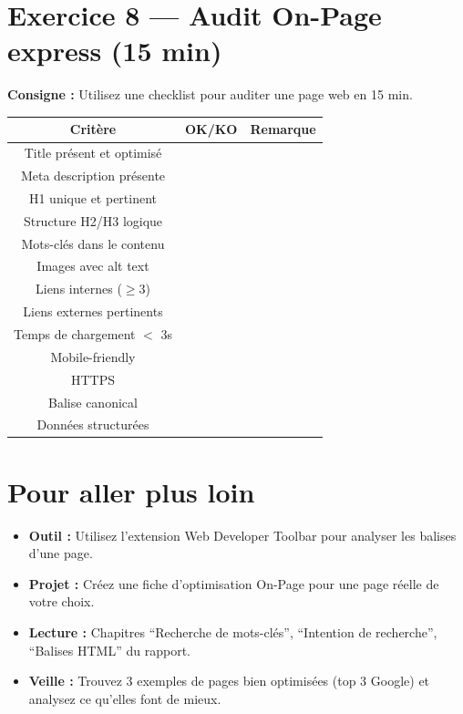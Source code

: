 \documentclass[12pt,a4paper]{report}
\begin{document}
\section{Exercice 8 --- Audit On-Page express (15 min)}

\textbf{Consigne :} Utilisez une checklist pour auditer une page web en 15 min.

\begin{longtable}{clp{6cm}}
\toprule
Crit\`{e}re & OK/KO & Remarque \\
\midrule
\endhead
\bottomrule
\endfoot
Title pr\'{e}sent et optimis\'{e} & & \\
Meta description pr\'{e}sente & & \\
H1 unique et pertinent & & \\
Structure H2/H3 logique & & \\
Mots-cl\'{e}s dans le contenu & & \\
Images avec alt text & & \\
Liens internes ($\geq$3) & & \\
Liens externes pertinents & & \\
Temps de chargement $<$ 3s & & \\
Mobile-friendly & & \\
HTTPS & & \\
Balise canonical & & \\
Donn\'{e}es structur\'{e}es & & \\
\bottomrule
\end{longtable}

\section{Pour aller plus loin}

\begin{itemize}
    \item \textbf{Outil :} Utilisez l'extension Web Developer Toolbar pour analyser les balises d'une page.
    \item \textbf{Projet :} Cr\'{e}ez une fiche d'optimisation On-Page pour une page r\'{e}elle de votre choix.
    \item \textbf{Lecture :} Chapitres ``Recherche de mots-cl\'{e}s'', ``Intention de recherche'', ``Balises HTML'' du rapport.
    \item \textbf{Veille :} Trouvez 3 exemples de pages bien optimis\'{e}es (top 3 Google) et analysez ce qu'elles font de mieux.
\end{itemize}
\end{document}
